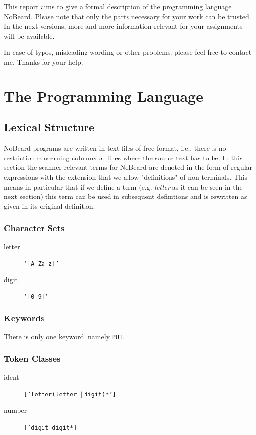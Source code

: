 \documentclass[11pt]{report}
\newcommand{\leongage}{NoBeard}
\newcommand{\alternative}{$\mid \;$}
\begin{document}
This report aims to give a formal description of the programming language \leongage. Please note that only the parts
necessary for your work can be trusted. In the next versions, more and more information relevant for your assignments
will be available.

In case of typos, misleading wording or other problems, please feel free to contact me. Thanks for your help.
\chapter{The Programming Language}
\section{Lexical Structure}

\leongage{} programs are written in text files of free format, i.e., there is no restriction concerning columns or lines where
the source text has to be. In this section the scanner relevant terms for \leongage{} are denoted in the form of regular expressions
with the extension that we allow "definitions" of non-terminals. This means in particular that if we define a term (e.g.
{\em letter} as it can be seen in the next section) this term can be used in subsequent definitions and is rewritten as
given in its original definition.

\subsection{Character Sets}
\begin{description}
	\item[letter] \texttt{'[A-Za-z]'}
	\item[digit]\texttt{'[0-9]'}
\end{description}

\subsection{Keywords}
There is only one keyword, namely \texttt{PUT}.

\subsection{Token Classes}
\begin{description}
	\item[ident] \texttt{['letter(letter \alternative digit)*']}
	\item[number] \texttt{['digit digit*]}
\end{description}
\end{document}
